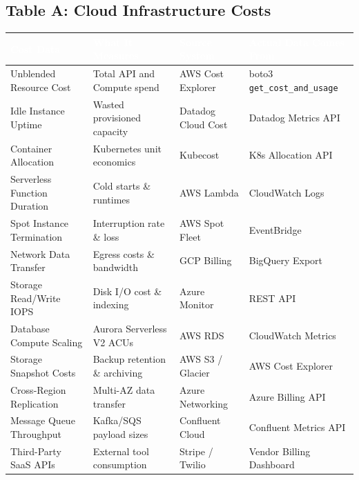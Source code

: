 \documentclass[11pt,a4paper]{article}
\begin{document}
\subsection{Table A: Cloud Infrastructure Costs}
\begin{table}[H]
\centering
\renewcommand{\arraystretch}{1.4}
\begin{tabularx}{\textwidth}{| >{\raggedright\arraybackslash}X >{\raggedright\arraybackslash}X >{\raggedright\arraybackslash}p{3cm} >{\raggedright\arraybackslash}X |}
\hline
\rowcolor{dpiblue} \textcolor{white}{\textbf{Cost Data}} & \textcolor{white}{\textbf{What It Measures}} & \textcolor{white}{\textbf{Source System}} & \textcolor{white}{\textbf{Actual Data Comes From}} \\
\hline
Unblended Resource Cost & Total API and Compute spend & AWS Cost Explorer & boto3 \texttt{get\_cost\_and\_usage} \\
Idle Instance Uptime & Wasted provisioned capacity & Datadog Cloud Cost & Datadog Metrics API \\
Container Allocation & Kubernetes unit economics & Kubecost & K8s Allocation API \\
Serverless Function Duration & Cold starts \& runtimes & AWS Lambda & CloudWatch Logs \\
Spot Instance Termination & Interruption rate \& loss & AWS Spot Fleet & EventBridge \\
Network Data Transfer & Egress costs \& bandwidth & GCP Billing & BigQuery Export \\
Storage Read/Write IOPS & Disk I/O cost \& indexing & Azure Monitor & REST API \\
Database Compute Scaling & Aurora Serverless V2 ACUs & AWS RDS & CloudWatch Metrics \\
Storage Snapshot Costs & Backup retention \& archiving & AWS S3 / Glacier & AWS Cost Explorer \\
Cross-Region Replication & Multi-AZ data transfer & Azure Networking & Azure Billing API \\
Message Queue Throughput & Kafka/SQS payload sizes & Confluent Cloud & Confluent Metrics API \\
Third-Party SaaS APIs & External tool consumption & Stripe / Twilio & Vendor Billing Dashboard \\
\hline
\end{tabularx}
\end{table}
\end{document}
